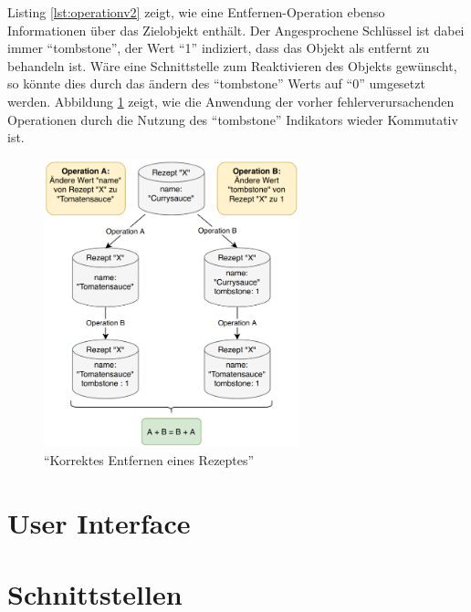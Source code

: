 \documentclass[a4paper, 12pt]{scrreprt}
\begin{document}
\begin{minipage}{\linewidth}
	
\end{minipage}

Listing \ref{lst:operationv2} zeigt, wie eine Entfernen-Operation ebenso Informationen über das Zielobjekt enthält. Der Angesprochene Schlüssel ist dabei immer \enquote{tombstone}, der Wert \enquote{1} indiziert, dass das Objekt als entfernt zu behandeln ist. Wäre eine Schnittstelle zum Reaktivieren des Objekts gewünscht, so könnte dies durch das ändern des \enquote{tombstone} Werts auf \enquote{0} umgesetzt werden. Abbildung \ref{fig:rezeptLöschenGut} zeigt, wie die Anwendung der vorher fehlerverursachenden Operationen durch die Nutzung des \enquote{tombstone} Indikators wieder Kommutativ ist.

\begin{figure}[H]
	\centering
	\includegraphics[width=0.66\textwidth]{deleteRecipeGood.png}
	\caption{\enquote{Korrektes Entfernen eines Rezeptes}}
	\label{fig:rezeptLöschenGut}
\end{figure}



\section{User Interface}
\section{Schnittstellen}
\newpage
\printbibliography
\end{document}
